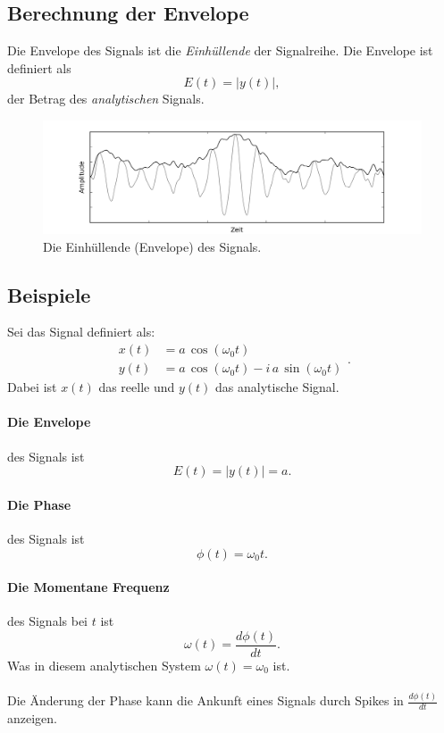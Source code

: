 \subsection{Berechnung der Envelope}
\label{sec:signalyse_envelope}
Die Envelope des Signals ist die \textit{Einhüllende} der Signalreihe. Die Envelope ist definiert als
\begin{equation}
E(t) = |y(t)|,
\end{equation} 
der Betrag des \textit{analytischen} Signals.
\begin{figure}[h!]
\centering
\includegraphics[width=.9\tw]{fig/08-Signalanalyse/envelope.png}
\caption{Die Einhüllende (Envelope) des Signals.}
\end{figure}


\subsection{Beispiele}
Sei das Signal definiert als:
\[
\begin{split}
x(t) & = a\, \cos (\omega_0 t)\\
y(t) & = a\, \cos(\omega_0 t) - i\, a\, \sin (\omega_0 t)
\end{split}.
\]
Dabei ist $x(t)$ das reelle und $y(t)$ das analytische Signal.

\paragraph{Die Envelope} des Signals ist
\[
E(t) = |y(t)| = a.
\]

\paragraph{Die Phase} des Signals ist
\[
\phi(t) = \omega_0 t.
\]

\paragraph{Die Momentane Frequenz} des Signals bei $t$ ist
\[
\omega(t) = \frac{d \phi(t)}{d t}.
\]
Was in diesem analytischen System $\omega(t) = \omega_0$ ist.\\\\
Die Änderung der Phase kann die Ankunft eines Signals durch Spikes in $\frac{d \phi(t)}{d t}$ anzeigen.


